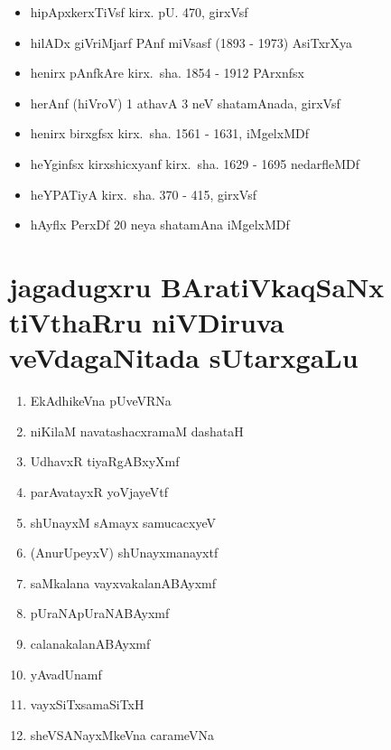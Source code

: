 {\begin{itemize}
\item hipApxkerxTiVsf kirx. pU. {\rm 470}, girxVsf
\item hilADx giVriMjarf PAnf miVsasf {\rm (1893 - 1973)} AsiTxrXya
\item henirx pAnfkAre kirx.~sha. {\rm 1854 - 1912} PArxnfsx
\item herAnf (hiVroV) {\rm 1} athavA {\rm 3} neV shatamAnada, girxVsf
\item henirx birxgfsx kirx.~sha. {\rm 1561 - 1631}, iMgelxMDf
\item heYginfsx kirxshicxyanf kirx.~sha. {\rm 1629 - 1695} nedarfleMDf
\item heYPATiyA kirx.~sha. {\rm 370 - 415}, girxVsf
\item hAyflx PerxDf {\rm 20} neya shatamAna iMgelxMDf
\end{itemize}

\newpage
\section*{jagadugxru BAratiVkaqSaNx tiVthaRru niVDiruva veVdagaNitada sUtarxgaLu}

\begin{enumerate}[\rm 1)]
\item EkAdhikeVna pUveVRNa

\item niKilaM navatashacxramaM dashataH

\item UdhavxR tiyaRgABxyXmf 

\item parAvatayxR yoVjayeVtf 

\item shUnayxM sAmayx samucacxyeV

\item (AnurUpeyxV) shUnayxmanayxtf

\item saMkalana vayxvakalanABAyxmf

\item pUraNApUraNABAyxmf

\item calanakalanABAyxmf

\item yAvadUnamf

\item vayxSiTxsamaSiTxH

\item sheVSANayxMkeVna carameVNa


\end{enumerate}}
